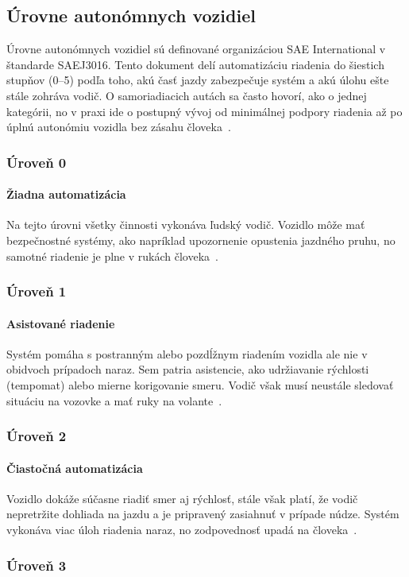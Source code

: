 \subsection{Úrovne autonómnych vozidiel}
Úrovne autonómnych vozidiel sú definované organizáciou SAE International v štandarde SAEJ3016. Tento dokument delí automatizáciu riadenia do šiestich stupňov (0--5) podľa toho, akú časť jazdy zabezpečuje systém a akú úlohu ešte stále zohráva vodič. O samoriadiacich autách sa často hovorí, ako o jednej kategórii, no v praxi ide o postupný vývoj od minimálnej podpory riadenia až po úplnú autonómiu vozidla bez zásahu človeka~\cite{saej3016}.
\subsubsection{Úroveň 0}
\paragraph{Žiadna automatizácia}Na tejto úrovni všetky činnosti vykonáva ľudský vodič. Vozidlo môže mať bezpečnostné systémy, ako napríklad upozornenie opustenia jazdného pruhu, no samotné riadenie je plne v rukách človeka~\cite{saej3016}.
\subsubsection{Úroveň 1}
\paragraph{Asistované riadenie}Systém pomáha s postranným alebo pozdĺžnym riadením vozidla ale nie v obidvoch prípadoch naraz. Sem patria asistencie, ako udržiavanie rýchlosti (tempomat) alebo mierne korigovanie smeru. Vodič však musí neustále sledovať situáciu na vozovke a mať ruky na volante~\cite{saej3016}.
\subsubsection{Úroveň 2}
\paragraph{Čiastočná automatizácia}Vozidlo dokáže súčasne riadiť smer aj rýchlosť, stále však platí, že vodič nepretržite dohliada na jazdu a je pripravený zasiahnuť v prípade núdze. Systém vykonáva viac úloh riadenia naraz, no zodpovednosť upadá na človeka~\cite{saej3016}.
\subsubsection{Úroveň 3}
